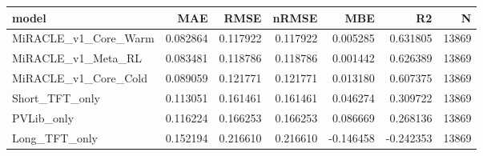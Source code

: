 \begin{tabular}{lrrrrrr}
\toprule
model & MAE & RMSE & nRMSE & MBE & R2 & N \\
\midrule
MiRACLE_v1_Core_Warm & 0.082864 & 0.117922 & 0.117922 & 0.005285 & 0.631805 & 13869 \\
MiRACLE_v1_Meta_RL & 0.083481 & 0.118786 & 0.118786 & 0.001442 & 0.626389 & 13869 \\
MiRACLE_v1_Core_Cold & 0.089059 & 0.121771 & 0.121771 & 0.013180 & 0.607375 & 13869 \\
Short_TFT_only & 0.113051 & 0.161461 & 0.161461 & 0.046274 & 0.309722 & 13869 \\
PVLib_only & 0.116224 & 0.166253 & 0.166253 & 0.086669 & 0.268136 & 13869 \\
Long_TFT_only & 0.152194 & 0.216610 & 0.216610 & -0.146458 & -0.242353 & 13869 \\
\bottomrule
\end{tabular}
